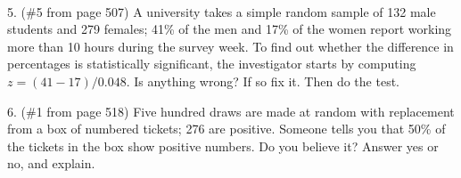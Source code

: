 \documentclass[10pt]{article}
\begin{document}
\vfill
\eject
{\ }

5. (\#5 from page 507)
A university takes a simple random sample of 132 male students and 279 females;
41\% of the men and 17\% of the women report working more than 10 hours 
during the survey week.  To find out whether the difference in percentages is 
statistically significant, the investigator starts by computing
$z=(41-17)/0.048$.  Is anything wrong?    If so fix it.  Then do the test.
\vspace{2in}


6. (\#1 from page 518)
Five hundred draws are made at random with replacement from a box
of numbered tickets;  276 are positive.  Someone tells you that
50\% of the tickets in the box show positive numbers.  Do you believe it?  
Answer yes or no, and explain.
\vspace{2in}

\vfill
\eject
\end{document}
